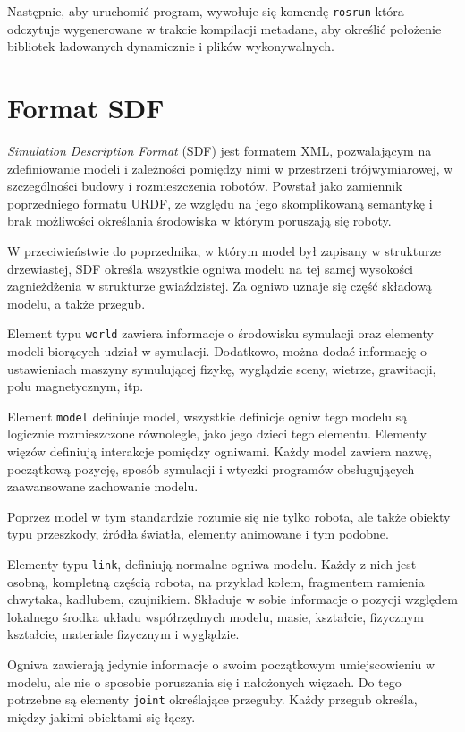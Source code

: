 		Następnie, aby uruchomić program, wywołuje się komendę \texttt{rosrun} która odczytuje wygenerowane w trakcie kompilacji metadane, aby określić położenie 
		bibliotek ładowanych dynamicznie i plików wykonywalnych.
		
\section{Format SDF}
	\label{sec:sdf}
	\emph{Simulation Description Format} (SDF) \cite{sdf_website} jest formatem XML, pozwalającym na zdefiniowanie modeli i zależności pomiędzy nimi w przestrzeni trójwymiarowej, 
	w szczególności budowy i rozmieszczenia robotów.
	Powstał jako zamiennik poprzedniego formatu URDF, ze względu na jego skomplikowaną semantykę i brak możliwości określania środowiska w którym poruszają się roboty.

	W przeciwieństwie do poprzednika, w którym model był zapisany w strukturze drzewiastej, SDF określa wszystkie ogniwa modelu na tej samej wysokości zagnieżdżenia w strukturze gwiaździstej. Za ogniwo uznaje się część składową modelu, a także przegub.
	
	Element typu \texttt{world} zawiera informacje o środowisku symulacji oraz elementy modeli biorących udział w symulacji.
	Dodatkowo, można dodać informację o ustawieniach maszyny symulującej fizykę, wyglądzie sceny, wietrze, grawitacji, polu magnetycznym, itp.
	
	Element \texttt{model} definiuje model, wszystkie definicje ogniw tego modelu są logicznie rozmieszczone równolegle, jako jego dzieci tego elementu.
	Elementy więzów definiują interakcje pomiędzy ogniwami.
	Każdy model zawiera nazwę, początkową pozycję, sposób symulacji i wtyczki programów obsługujących zaawansowane zachowanie modelu.

	Poprzez model w tym standardzie rozumie się nie tylko robota, ale także obiekty typu przeszkody, źródła światła, elementy animowane i tym podobne.

	Elementy typu \texttt{link}, definiują normalne ogniwa modelu. 
	Każdy z nich jest osobną, kompletną częścią robota, na przykład kołem, fragmentem ramienia chwytaka, kadłubem, czujnikiem.
	Składuje w sobie informacje o pozycji względem lokalnego środka układu współrzędnych modelu, masie, kształcie, fizycznym kształcie, materiale fizycznym i wyglądzie.
	
	Ogniwa zawierają jedynie informacje o swoim początkowym umiejscowieniu w modelu, ale nie o sposobie poruszania się i nałożonych więzach.
	Do tego potrzebne są elementy \texttt{joint} określające przeguby.
	Każdy przegub określa, między jakimi obiektami się łączy.
	
